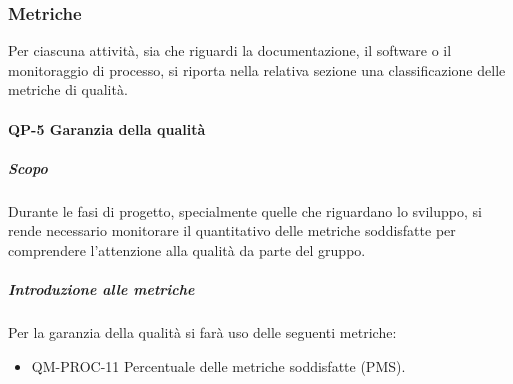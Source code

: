 	\subsubsection{Metriche}

		Per ciascuna attività, sia che riguardi la documentazione, il software o il monitoraggio di processo, si riporta nella relativa sezione una classificazione delle metriche di qualità. 

		\paragraph{QP-5 Garanzia della qualità}

        \subparagraph{Scopo}

            Durante le fasi di progetto, specialmente quelle che riguardano lo sviluppo, si rende necessario monitorare il quantitativo delle metriche soddisfatte per comprendere l'attenzione alla qualità da parte del gruppo.

        \subparagraph{Introduzione alle metriche}

        	Per la garanzia della qualità si farà uso delle seguenti metriche:

            \begin{itemize}
                \item QM-PROC-11 Percentuale delle metriche soddisfatte (PMS).
            \end{itemize}

